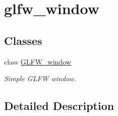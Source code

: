 \hypertarget{group__glfw__window}{}\section{glfw\+\_\+window}
\label{group__glfw__window}
\subsection*{Classes}
\begin{DoxyCompactItemize}
\item 
class \hyperlink{classGLFW__window}{G\+L\+F\+W\+\_\+window}
\begin{DoxyCompactList}\small\item\em Simple G\+L\+FW window. \end{DoxyCompactList}\end{DoxyCompactItemize}


\subsection{Detailed Description}
